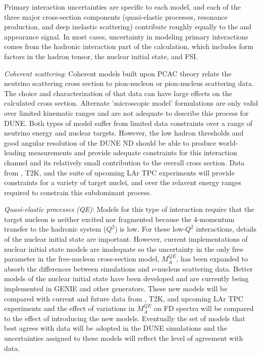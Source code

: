 Primary interaction uncertainties are specific to each model, and each of the three major
cross-section components (quasi-elastic processes, resonance production, and deep inelastic scattering)
contribute roughly equally to the \nue and \anue
appearance signal. In most cases, uncertainty in modeling primary interactions comes from the
hadronic interaction part of the calculation, which includes form factors in the hadron tensor,
the nuclear initial state, and FSI. 

  \emph{Coherent scattering}: Coherent models built upon PCAC theory relate the neutrino scattering 
  cross section to pion-nucleon or pion-nucleus scattering data. The choice and characterization
  of that data can have large effects on the calculated cross section. Alternate 'microscopic model' 
  formulations are only valid over limited kinematic ranges and are not adequate to describe this process 
  for DUNE. Both types of model suffer from limited data constraints over a range of neutrino energy
  and nuclear targets. 
  However, the low hadron thresholds and good angular resolution of the DUNE ND should be able
  to produce world-leading measurements and provide adequate constraints for this interaction channel and 
  its relatively small contribution to the overall cross section. Data from , T2K, and the suite
  of upcoming LAr TPC experiments will provide constraints for a variety of target nuclei, and over the
  relavent energy ranges required to constrain this subdominant process.
  

  \emph{Quasi-elastic processes (QE)}: Models for this type of interaction require that the target nucleon 
  is neither excited nor fragmented because the 4-momentum transfer to the hadronic system ($Q^{2}$) is low.
  For these low-$Q^{2}$ interactions, details of the nuclear initial state are important. However,
  current implementations of nuclear initial state models are inadequate so the uncertainty in the only
  free parameter in the free-nucleon cross-section model, $M_{A}^{QE}$, has been expanded to absorb the
  differences between simulations and $\nu$-nucleus scattering data. Better models of the nuclear
  initial state have been developed
  and are currently being implemented in GENIE and other generators. These new models will be compared with current 
  and future data from \minerva, T2K, and upcoming LAr TPC experiments and the effect of variations in $M_{A}^{QE}$
  on FD spectra will be compared to the effect of introducing the new models.
  Eventually the set of models that best agrees with data will be adopted in the DUNE simulations and
  the uncertainties assigned to these models will reflect the level of agreement with data.


